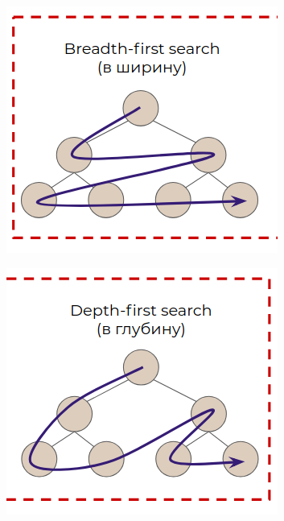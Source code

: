 \documentclass[11pt,a4paper]{extarticle}
\begin{document}
			\begin{figure}[ht]
				\centering
				\begin{subfigure}{2in}
					\includegraphics[width=\textwidth]{bvhtravers1}					
					\caption{}
					\label{bvhtravers1}					
				\end{subfigure}
				\begin{subfigure}{2in}
					\includegraphics[width=\textwidth]{bvhtravers2}					

\end{subfigure}
\end{figure}
\end{document}
